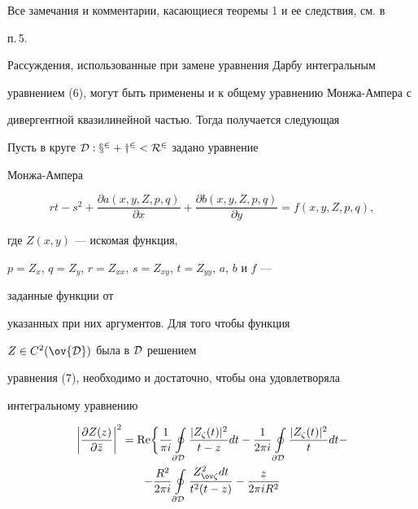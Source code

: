 Все замечания и комментарии, касающиеся теоремы 1 и ее следствия, см. в 


п.\,5. 


 


Рассуждения, использованные при замене уравнения Дарбу интегральным 


уравнением (6), могут быть применены и к общему уравнению Монжа-Ампера с 


дивергентной квазилинейной частью. Тогда получается следующая 


 


\begin{thm} Пусть в круге $\cal D:x^2+y^2<R^2$ задано уравнение 


Монжа-Ампера 


\begin{equation} 


rt-s^2+ 


\frac{\partial a(x,y,Z,p,q)}{\partial x}+ 


\frac{\partial b(x,y,Z,p,q)}{\partial y}=f(x,y,Z,p,q), 


\end{equation} 


где $Z(x,y)$ --- искомая функция, 


$p=Z_x$, $q=Z_y$, $r=Z_{xx}$, $s=Z_{xy}$, $t=Z_{yy}$, $a$, $b$ и $f$ --- 


заданные функции от 


указанных при них аргументов. Для того чтобы функция 


$Z\in C^2(\ov{\cal D})$ была в $\cal D$ решением 


уравнения (7), необходимо и достаточно, чтобы она удовлетворяла 


интегральному уравнению 


\begin{multline*} 


\biggl|\frac{\partial Z(z)}{\partial\Bar z}\biggr|^2= 


\re\biggl\{\frac{1}{\pi i}\ointl_{\partial\cal D} 


\frac{|Z_\zeta(t)|^2}{t-z}dt-\frac{1}{2\pi i}\ointl_{\partial\cal D} 


\frac{|Z_\zeta(t)|^2}{t}dt- \\ 


% 


-\frac{R^2}{2\pi i}\ointl_{\partial\cal D} 


\frac{Z^2_{\ov\zeta}dt}{t^2(t-z)}-\frac{z}{2\pi iR^2} 



\end{multline*}
\end{thm}
